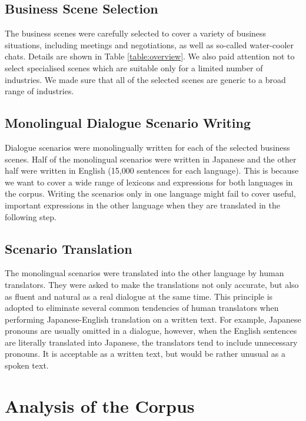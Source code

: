 \documentclass[11pt,a4paper]{article}
\begin{document}
\subsection{Business Scene Selection}

The business scenes were carefully selected to cover a variety of business situations, including meetings and negotiations, as well as so-called water-cooler chats. Details are shown in Table \ref{table:overview}. We also paid attention not to select specialised scenes which are suitable only for a limited number of industries. We made sure that all of the selected scenes are generic to a broad range of industries.

\subsection{Monolingual Dialogue Scenario Writing}

Dialogue scenarios were monolingually written for each of the selected business scenes. Half of the monolingual scenarios were written in Japanese and the other half were written in English (15,000 sentences for each language). This is because we want to cover a wide range of lexicons and expressions for both languages in the corpus. Writing the scenarios only in one language might fail to cover useful, important expressions in the other language when they are translated in the following step.

\subsection{Scenario Translation}

The monolingual scenarios were translated into the other language by human translators. They were asked to make the translations not only accurate, but also as fluent and natural as a real dialogue at the same time. This principle is adopted to eliminate several common tendencies of human translators when performing Japanese-English translation on a written text. For example, Japanese pronouns are usually omitted in a dialogue, however, when the English sentences are literally translated into Japanese, the translators tend to include unnecessary pronouns. It is acceptable as a written text, but would be rather unusual as a spoken text.

\section{Analysis of the Corpus}
\label{sec:error-analysis}
\end{document}
